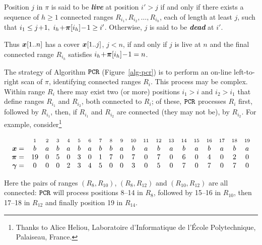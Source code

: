 \documentclass[runningheads,a4paper]{llncs}
\def\s#1{\mbox{\boldmath $#1$}}
\def\+{\!+\!}
\def\-{\!-\!}
\def\itbf#1{\textit{\textbf{#1}}}
\def\PCR{\tt{PCR}}
\begin{document}
\begin{definition}\label{defn-live}
Position $j$ in \s{\pi} is said to be \itbf{live} at position $i' > j$ if and only if
there exists a sequence of $h \ge 1$ connected ranges
$R_{i_1}, R_{i_2}, \ldots, R_{i_h}$, each of length at least $j$, such that
$i_1 \le j\+ 1,\ i_h\+ \s{\pi}[i_h]\- 1\ge i'$.
Otherwise, $j$ is said to be \itbf{dead} at $i'$.
\end{definition}

Thus $\s{x}[1..n]$ has a cover $\s{x}[1..j]$, $j < n$, if and only if
$j$ is live at $n$ and the final connected range $R_{i_h}$
satisfies $i_h\+ \s{\pi}[i_h]\- 1 = n$.

The strategy of Algorithm $\PCR$ (Figure~\ref{alg-pcr})
is to perform an on-line left-to-right scan of \s{\pi},
identifying connected ranges $R_i$.
This process may be complex.
Within range $R_i$ there may exist two (or more) positions $i_1 >i$ and $i_2 > i_1$
that define ranges $R_{i_1}$ and $R_{i_2}$, both connected to $R_i$;
of these, $\PCR$ processes $R_i$ first, followed by $R_{i_1}$,
then, if $R_{i_1}$ and $R_{i_2}$ are connected (they may not be),
by $R_{i_2}$.
For example, consider\footnote{Thanks to Alice Heliou,
Laboratoire d'Informatique de l'\'{E}cole Polytechnique, Palaiseau, France.}

\begin{equation}
\begin{array}{r cccccccccccccccccccc}
& \scriptstyle 1 & \scriptstyle 2 & \scriptstyle 3 & \scriptstyle 4 &
\scriptstyle 5 & \scriptstyle 6 & \scriptstyle 7 & \scriptstyle 8 & \scriptstyle 9 & \scriptstyle 10 & \scriptstyle 11 & \scriptstyle 12 & \scriptstyle 13 & \scriptstyle 14 & \scriptstyle 15 & \scriptstyle 16 & \scriptstyle 17 & \scriptstyle 18 & \scriptstyle 19 \\
\s{x} = & b & a & b & a & b & a & b & b & a & b & a & b & a & b & a & b & a
& b & a \label{alice} \\
\s{\pi} = & 19 & 0 & 5 & 0 & 3 & 0 & 1 & 7 & 0 & 7 & 0 & 7 & 0 & 6 & 0 & 4
& 0 & 2 & 0 \\ 
\s{\gamma} = & 0 & 0 & 0 & 2 & 3 & 4 & 5 & 0 & 0 & 3 & 0 & 5 & 0 & 7 & 0 &
7 & 0 & 7 & 0
\end{array}
\end{equation}

Here the pairs of ranges $(R_8,R_{10})$, $(R_8,R_{12})$ and $(R_{10},R_{12})$
are all connected:
$\PCR$ will process positions 8--14 in $R_8$,
followed by 15--16 in $R_{10}$, then 17--18 in $R_{12}$
and finally position 19 in $R_{14}$.
\end{document}
